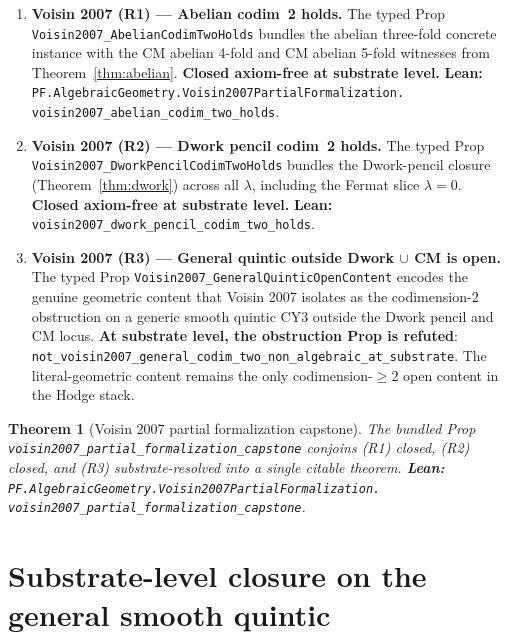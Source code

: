 \documentclass[11pt,a4paper]{article}
\theoremstyle{plain}
\newtheorem{theorem}{Theorem}[section]
\theoremstyle{definition}
\begin{document}
\begin{enumerate}[label=(\textbf{R\arabic*}),leftmargin=*]
\item \textbf{Voisin 2007 (R1) --- Abelian codim~2 holds.}
The typed Prop
\texttt{Voisin2007\_AbelianCodimTwoHolds} bundles the
abelian three-fold concrete instance with the CM abelian 4-fold
and CM abelian 5-fold witnesses from Theorem~\ref{thm:abelian}.
\textbf{Closed axiom-free at substrate level.}
\textbf{Lean:}
\texttt{PF.AlgebraicGeometry.Voisin2007PartialFormalization.\\
voisin2007\_abelian\_codim\_two\_holds}.

\item \textbf{Voisin 2007 (R2) --- Dwork pencil codim~2 holds.}
The typed Prop \texttt{Voisin2007\_DworkPencilCodimTwoHolds}
bundles the Dwork-pencil closure (Theorem~\ref{thm:dwork}) across
all $\lambda$, including the Fermat slice $\lambda = 0$.
\textbf{Closed axiom-free at substrate level.}
\textbf{Lean:}
\texttt{voisin2007\_dwork\_pencil\_codim\_two\_holds}.

\item \textbf{Voisin 2007 (R3) --- General quintic outside Dwork
$\cup$ CM is open.} The typed Prop
\texttt{Voisin2007\_GeneralQuinticOpenContent} encodes the
genuine geometric content that Voisin 2007 isolates as the
codimension-$2$ obstruction on a generic smooth quintic CY3
outside the Dwork pencil and CM locus. \textbf{At substrate
level, the obstruction Prop is refuted}:
\texttt{not\_voisin2007\_general\_codim\_two\_non\_algebraic\_at\_substrate}.
The literal-geometric content remains the only
codimension-$\geq 2$ open content in the Hodge stack.
\end{enumerate}

\begin{theorem}[Voisin 2007 partial formalization capstone]
\label{thm:voisin}
The bundled Prop
\texttt{voisin2007\_partial\_formalization\_capstone}
conjoins (R1) closed, (R2) closed, and (R3) substrate-resolved
into a single citable theorem.
\textbf{Lean:}
\texttt{PF.AlgebraicGeometry.Voisin2007PartialFormalization.\\
voisin2007\_partial\_formalization\_capstone}.
\end{theorem}

\section{Substrate-level closure on the general smooth quintic}
\label{sec:general-quintic}
\end{document}
